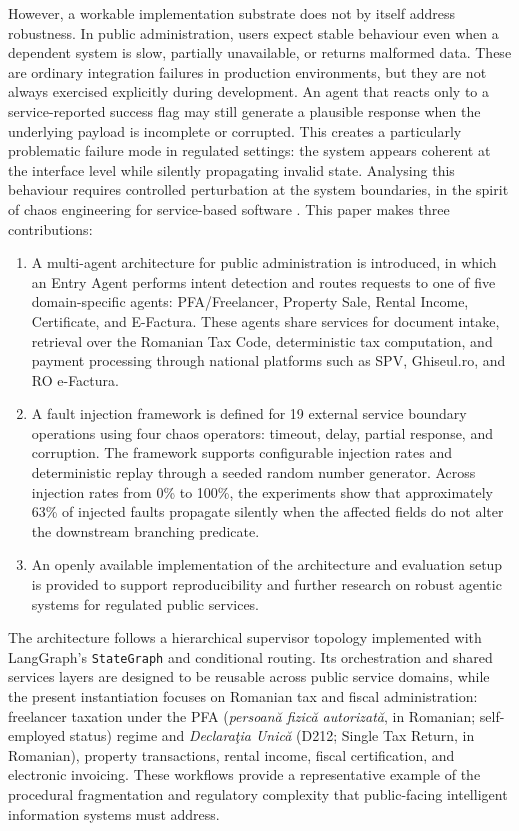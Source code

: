 \documentclass[3p,times,procedia]{elsarticle}
\begin{document}
However, a workable implementation substrate does not by itself address robustness. In public administration, users expect stable behaviour even when a dependent system is slow, partially unavailable, or returns malformed data. These are ordinary integration failures in production environments, but they are not always exercised explicitly during development. An agent that reacts only to a service-reported success flag may still generate a plausible response when the underlying payload is incomplete or corrupted. This creates a particularly problematic failure mode in regulated settings: the system appears coherent at the interface level while silently propagating invalid state. Analysing this behaviour requires controlled perturbation at the system boundaries, in the spirit of chaos engineering for service-based software \cite{Basiri2016}.
This paper makes three contributions:
\vspace{-2mm}
\begin{enumerate}
    \item A multi-agent architecture for public administration is introduced, in which an Entry Agent performs intent detection and routes requests to one of five domain-specific agents: PFA/Freelancer, Property Sale, Rental Income, Certificate, and E-Factura. These agents share services for document intake, retrieval over the Romanian Tax Code, deterministic tax computation, and payment processing through national platforms such as SPV, Ghiseul.ro, and RO e-Factura.
    \item A fault injection framework is defined for 19 external service boundary operations using four chaos operators: timeout, delay, partial response, and corruption. The framework supports configurable injection rates and deterministic replay through a seeded random number generator. Across injection rates from 0\% to 100\%, the experiments show that approximately 63\% of injected faults propagate silently when the affected fields do not alter the downstream branching predicate.
    \item An openly available implementation of the architecture and evaluation setup is provided to support reproducibility and further research on robust agentic systems for regulated public services.
\end{enumerate}

The architecture follows a hierarchical supervisor topology \cite{AutoGen2023} implemented with LangGraph's \texttt{StateGraph} and conditional routing. Its orchestration and shared services layers are designed to be reusable across public service domains, while the present instantiation focuses on Romanian tax and fiscal administration: freelancer taxation under the PFA (\textit{persoan\u{a} fizic\u{a} autorizat\u{a}}, in Romanian; self-employed status) regime and \textit{Declara\c{t}ia Unic\u{a}} (D212; Single Tax Return, in Romanian), property transactions, rental income, fiscal certification, and electronic invoicing. These workflows provide a representative example of the procedural fragmentation and regulatory complexity that public-facing intelligent information systems must address.
\end{document}
